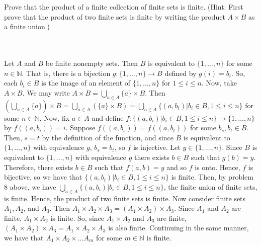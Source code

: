 Prove that the product of a finite collection of finite sets is finite. (Hint: First prove that the
product of two finite sets is finite by writing the product $A\times B$ as a finite union.)\\\\

\begin{solution}\renewcommand{\qedsymbol}{}\ \\
    Let $A$ and $B$ be finite nonempty sets. Then $B$ is equivalent to $\{1,\ldots, n\}$ for some
    $n\in\mathbb{N}$. That is, there is a bijection $g:\{1,\ldots, n\}\rightarrow B$ defined by
    $g(i)=b_i$. So, each $b_i\in B$ is the image of an element of $\{1,\ldots, n\}$ for $1\leq i\leq n$.
    Now, take $A\times B$. We may write $A\times B=\bigcup_{a\in A}\{a\}\times B$. Then
    $(\bigcup_{a\in A}\{a\})\times B=\bigcup_{a\in A}(\{a\}\times B)=
    \bigcup_{a\in A}\{(a,b_i)|b_i\in B, 1\leq i\leq n\}$ for some $n\in\mathbb{N}$. Now, fix $a\in A$
    and define $f:\{(a,b_i)|b_i\in B, 1\leq i\leq n\}\rightarrow\{1,\ldots, n\}$ by $f((a,b_i))=i$.
    Suppose $f((a,b_s))=f((a,b_t))$ for some $b_s,b_t\in B$. Then, $s=t$ by the definition of the
    function, and since $B$ is equivalent to $\{1,\dots, n\}$ with equivalence $g$, $b_s=b_t$, so $f$ is
    injective. Let $y\in\{1,\ldots, n\}$. Since $B$ is equivalent to $\{1,\ldots, n\}$ with equivalence
    $g$ there exists $b\in B$ such that $g(b)=y$. Therefore, there exists $b\in B$ such that $f(a,b)=y$
    and so $f$ is onto. Hence, $f$ is bijective, so we have that $\{(a,b_i)|b_i\in B, 1\leq i\leq n\}$
    is finite. Then, by problem 8 above, we have $\bigcup_{a\in A}\{(a,b_i)|b_i\in B, 1\leq i\leq n\}$,
    the finite union of finite sets, is finite. Hence, the product of two finite sets is finite. Now
    consider finite sets $A_1, A_2$, and $A_3$. Then
    $A_1\times A_2\times A_3=(A_1\times A_2)\times A_3$. Since $A_1$ and $A_2$ are finite,
    $A_1\times A_2$ is finite. So, since $A_1\times A_2$ and $A_3$ are finite,
    $(A_1\times A_2)\times A_3=A_1\times A_2\times A_3$ is also finite. Continuing in the same manner,
    we have that $A_1\times A_2\times\dots A_m$ for some $m\in\mathbb{N}$ is finite.

\end{solution}